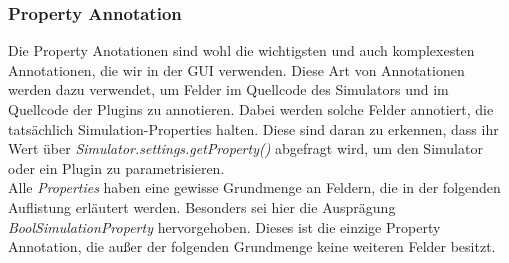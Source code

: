 \documentclass[a4paper, 11pt]{article} %
\begin{document}
\subsubsection{Property Annotation} %
\label{ssub:feld_annotation}
Die Property Anotationen sind wohl die wichtigsten und auch komplexesten Annotationen, die wir in der GUI verwenden. Diese Art von Annotationen werden dazu verwendet, um Felder im Quellcode des Simulators und im Quellcode der Plugins zu annotieren. Dabei werden solche Felder annotiert, die tatsächlich Simulation-Properties halten. Diese sind daran zu erkennen, dass ihr Wert über \emph{Simulator.settings.getProperty()} abgefragt wird, um den Simulator oder ein Plugin zu parametrisieren.\\

Alle \emph{Properties} haben eine gewisse Grundmenge an Feldern, die in der folgenden Auflistung erläutert werden. Besonders sei hier die Ausprägung \emph{BoolSimulationProperty} hervorgehoben. Dieses ist die einzige Property Annotation, die außer der folgenden Grundmenge keine weiteren Felder besitzt.
\end{document}

